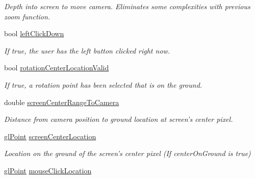 \begin{DoxyCompactItemize}
\begin{DoxyCompactList}\small\item\em Depth into screen to move camera. Eliminates some complexities with previous zoom function. \end{DoxyCompactList}\item 
\hypertarget{class_viewer3_d_a143dc211aab01acbd7365bb342aab6fc}{
bool \hyperlink{class_viewer3_d_a143dc211aab01acbd7365bb342aab6fc}{leftClickDown}}
\label{class_viewer3_d_a143dc211aab01acbd7365bb342aab6fc}

\begin{DoxyCompactList}\small\item\em If true, the user has the left button clicked right now. \end{DoxyCompactList}\item 
\hypertarget{class_viewer3_d_ac19766f9a061c5b573be7409dfd2f2cd}{
bool \hyperlink{class_viewer3_d_ac19766f9a061c5b573be7409dfd2f2cd}{rotationCenterLocationValid}}
\label{class_viewer3_d_ac19766f9a061c5b573be7409dfd2f2cd}

\begin{DoxyCompactList}\small\item\em If true, a rotation point has been selected that is on the ground. \end{DoxyCompactList}\item 
\hypertarget{class_viewer3_d_ada58f827be15a16ea0b2afd87cca16ea}{
double \hyperlink{class_viewer3_d_ada58f827be15a16ea0b2afd87cca16ea}{screenCenterRangeToCamera}}
\label{class_viewer3_d_ada58f827be15a16ea0b2afd87cca16ea}

\begin{DoxyCompactList}\small\item\em Distance from camera position to ground location at screen's center pixel. \end{DoxyCompactList}\item 
\hypertarget{class_viewer3_d_a8c30399f1db463a40b833caeef0b81de}{
\hyperlink{classgl_point}{glPoint} \hyperlink{class_viewer3_d_a8c30399f1db463a40b833caeef0b81de}{screenCenterLocation}}
\label{class_viewer3_d_a8c30399f1db463a40b833caeef0b81de}

\begin{DoxyCompactList}\small\item\em Location on the ground of the screen's center pixel (If centerOnGround is true) \end{DoxyCompactList}\item 
\hypertarget{class_viewer3_d_a8b863d68215d9c48d27531e1f6381efb}{
\hyperlink{classgl_point}{glPoint} \hyperlink{class_viewer3_d_a8b863d68215d9c48d27531e1f6381efb}{mouseClickLocation}}
\label{class_viewer3_d_a8b863d68215d9c48d27531e1f6381efb}


\end{DoxyCompactItemize}
